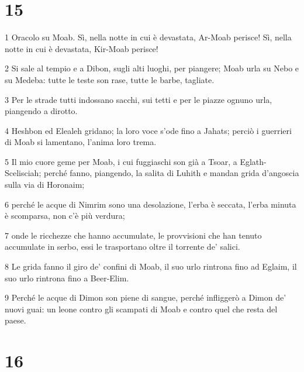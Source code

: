 \chapter{15}

\par 1 Oracolo su Moab. Sì, nella notte in cui è devastata, Ar-Moab perisce! Sì, nella notte in cui è devastata, Kir-Moab perisce!
\par 2 Si sale al tempio e a Dibon, sugli alti luoghi, per piangere; Moab urla su Nebo e su Medeba: tutte le teste son rase, tutte le barbe, tagliate.
\par 3 Per le strade tutti indossano sacchi, sui tetti e per le piazze ognuno urla, piangendo a dirotto.
\par 4 Heshbon ed Elealeh gridano; la loro voce s'ode fino a Jahats; perciò i guerrieri di Moab si lamentano, l'anima loro trema.
\par 5 Il mio cuore geme per Moab, i cui fuggiaschi son già a Tsoar, a Eglath-Scelisciah; perché fanno, piangendo, la salita di Luhith e mandan grida d'angoscia sulla via di Horonaim;
\par 6 perché le acque di Nimrim sono una desolazione, l'erba è seccata, l'erba minuta è scomparsa, non c'è più verdura;
\par 7 onde le ricchezze che hanno accumulate, le provvisioni che han tenuto accumulate in serbo, essi le trasportano oltre il torrente de' salici.
\par 8 Le grida fanno il giro de' confini di Moab, il suo urlo rintrona fino ad Eglaim, il suo urlo rintrona fino a Beer-Elim.
\par 9 Perché le acque di Dimon son piene di sangue, perché infliggerò a Dimon de' nuovi guai: un leone contro gli scampati di Moab e contro quel che resta del paese.

\chapter{16}

